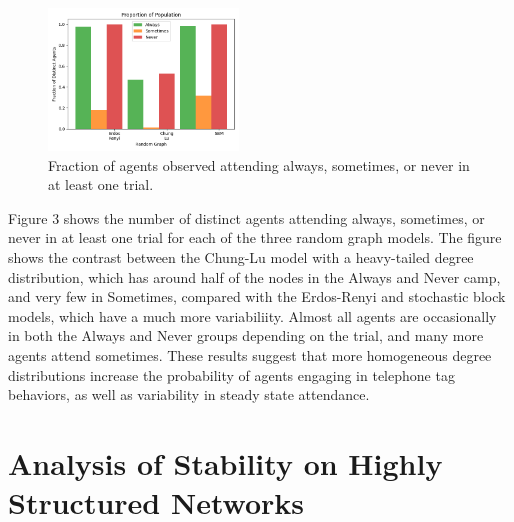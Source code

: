 \documentclass[12pt]{article}
\begin{document}
\begin{figure}[h!]
\includegraphics[width=0.45\textwidth]{always_sometimes_never.png}
\caption{Fraction of agents observed attending always, sometimes, or never in at least one trial.}
\end{figure}

Figure 3 shows the number of distinct agents attending always, sometimes, or never in at least one trial for each of the three random graph models.  The figure shows the contrast between the Chung-Lu model with a heavy-tailed degree distribution, which has around half of the nodes in the Always and Never camp, and very few in Sometimes, compared with the Erdos-Renyi and stochastic block models, which have a much more variabiliity.  Almost all agents are occasionally in both the Always and Never groups depending on the trial, and many more agents attend sometimes.  These results suggest that more homogeneous degree distributions increase the probability of agents engaging in telephone tag behaviors, as well as variability in steady state attendance.

\section{Analysis of Stability on Highly Structured Networks}
\end{document}
